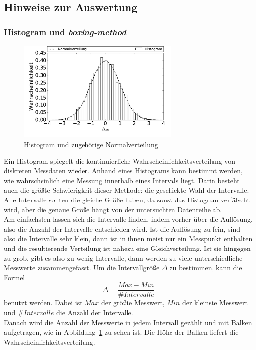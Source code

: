 \subsection*{Hinweise zur Auswertung}

\subsubsection*{Histogram und \emph{boxing-method}}
\begin{figure}[h!]
  \centering
  \includegraphics[width=0.7\textwidth]{figures/histogram}
  \caption{Histogram und zugehörige Normalverteilung}\label{fig:histo}
\end{figure}
Ein Histogram spiegelt die kontinuierliche Wahrscheinlichkeitsverteilung von diskreten Messdaten wieder. Anhand eines Histograms kann bestimmt werden, wie wahrscheinlich eine Messung innerhalb eines Intervals liegt. Darin besteht auch die größte Schwierigkeit dieser Methode: die geschickte Wahl der Intervalle. Alle Intervalle sollten die gleiche Größe haben, da sonst das Histogram verfälscht wird, aber die genaue Größe hängt von der untersuchten  Datenreihe ab.\\
Am einfachsten lassen sich die Intervalle finden, indem vorher über die Auflösung, also die Anzahl der Intervalle entschieden wird.  Ist die Auflösung zu fein, sind also die Intervalle sehr klein, dann ist in ihnen meist nur ein Messpunkt enthalten und die resultierende Verteilung ist nahezu eine Gleichverteilung. Ist sie hingegen zu grob, gibt es also zu wenig Intervalle, dann werden zu viele unterschiedliche Messwerte zusammengefasst. Um die Intervallgröße $\Delta$ zu bestimmen, kann die Formel
\begin{equation}
  \Delta = \frac{Max - Min}{\#Intervalle}
\end{equation}
benutzt werden. Dabei ist $Max$ der größte Messwert, $Min$ der kleinste Messwert und $\#Intervalle$ die Anzahl der Intervalle.\\
Danach wird die Anzahl der Messwerte in jedem Intervall gezählt und mit Balken aufgetragen, wie in Abbildung~\ref{fig:histo} zu sehen ist. Die Höhe der Balken liefert die Wahrscheinlichkeitsverteilung.

